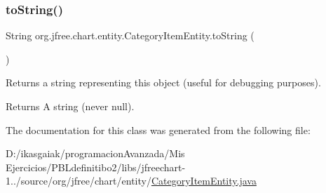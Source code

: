 \subsubsection{\texorpdfstring{to\+String()}{toString()}}
{\footnotesize\ttfamily String org.\+jfree.\+chart.\+entity.\+Category\+Item\+Entity.\+to\+String (\begin{DoxyParamCaption}{ }\end{DoxyParamCaption})}

Returns a string representing this object (useful for debugging purposes).

\begin{DoxyReturn}{Returns}
A string (never {\ttfamily null}). 
\end{DoxyReturn}


The documentation for this class was generated from the following file\+:\begin{DoxyCompactItemize}
\item 
D\+:/ikasgaiak/programacion\+Avanzada/\+Mis Ejercicios/\+P\+B\+Ldefinitibo2/libs/jfreechart-\/1../source/org/jfree/chart/entity/\mbox{\hyperlink{_category_item_entity_8java}{Category\+Item\+Entity.\+java}}\end{DoxyCompactItemize}
